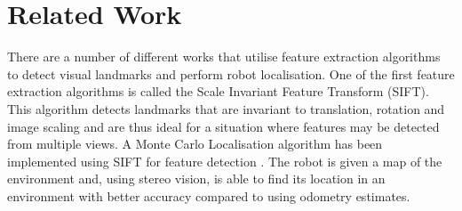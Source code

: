%
%
%
%
%


\section{Related Work}
\label{sec:relatedWork}
There are a number of different works that utilise feature extraction algorithms to detect visual landmarks and perform robot localisation. One of the first feature extraction algorithms is called the Scale Invariant Feature Transform (SIFT)\citep{Lowe2004}. This algorithm detects landmarks that are invariant to translation, rotation and image scaling and are thus ideal for a situation where features may be detected from multiple views. A Monte Carlo Localisation algorithm has been implemented using SIFT for feature detection \citep{Gil}. The robot is given a map of the environment and, using stereo vision, is able to find its location in an environment with better accuracy compared to using odometry estimates.\\


